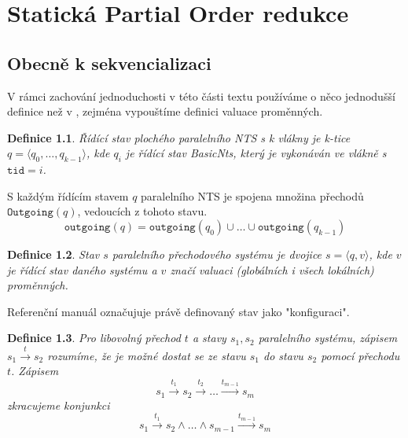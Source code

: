 \documentclass[10pt,a4paper,notitlepage]{report}
\newtheorem{definition}{Definice}
\newcommand{\tuple}[1]{\langle #1 \rangle}
\begin{document}


\chapter{Statická Partial Order redukce}

\section{Obecně k sekvencializaci}
V rámci zachování jednoduchosti v této části textu používáme o něco jednodušší definice než v \cite{NTSref}, zejména vypouštíme definici valuace proměnných.

\begin{definition}
Řídící stav plochého paralelního NTS s k vlákny je k-tice $q = \tuple{q_0, \ldots, q_{k-1}}$, kde $q_i$ je řídící stav BasicNts, který je vykonáván ve vlákně s $\texttt{tid} = i$.
\end{definition}
S každým řídícím stavem $q$ paralelního NTS je spojena množina přechodů $\texttt{Outgoing}(q)$, vedoucích z tohoto stavu.
\begin{equation}
\texttt{outgoing}(q) = \texttt{outgoing}(q_0) \cup \ldots \cup \texttt{outgoing}(q_{k-1})
\end{equation}

\begin{definition}
Stav $s$ paralelního přechodového systému je dvojice $s = \tuple{q, v}$, kde $v$ je řídící stav daného systému a $v$ značí valuaci (globálních i všech lokálních) proměnných.
\end{definition}
Referenční manuál označujuje právě definovaný stav jako "konfiguraci".

\begin{definition}
Pro libovolný přechod $t$ a stavy $s_1, s_2$ paralelního systému, zápisem $s_1 \xrightarrow{t} s_2$ rozumíme, že je možné dostat se ze stavu $s_1$ do stavu $s_2$ pomocí přechodu $t$. Zápisem
\begin{equation*}
s_1 \xrightarrow{t_1} s_2 \xrightarrow{t_2} \ldots \xrightarrow{t_{m-1}} s_m
\end{equation*}
zkracujeme konjunkci
\begin{equation*}
s_1 \xrightarrow{t_1} s_2 \land \ldots \land s_{m-1} \xrightarrow{t_{m-1}} s_m
\end{equation*}
\end{definition}
\end{document}

